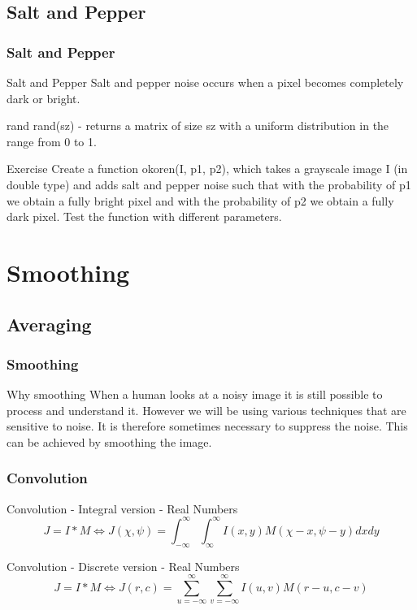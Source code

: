 \documentclass{beamer}
\begin{document}
\subsection{Salt and Pepper}
\begin{frame}
\frametitle{Salt and Pepper}
\begin{block}{Salt and Pepper}
Salt and pepper noise occurs when a pixel becomes completely dark or bright. 
\end{block}

\begin{block}{rand}
rand(sz) - returns a matrix of size sz with a uniform distribution in the range from 0 to 1.
\end{block}


\begin{block}{Exercise}
Create a function okoren(I, p1, p2), which takes a grayscale image I (in double type) and adds salt and pepper noise such that with the probability of p1 we obtain a fully bright pixel and with the probability of p2 we obtain a fully dark pixel. Test the function with different parameters.
\end{block}
\end{frame}


\section{Smoothing}
\subsection{Averaging}
\begin{frame}
\frametitle{Smoothing}
\begin{block}{Why smoothing}
When a human looks at a noisy image it is still possible to process and understand it. However we will be using various techniques that are sensitive to noise. It is therefore sometimes necessary to suppress the noise. This can be achieved by smoothing the image.
\end{block}
\end{frame}

\begin{frame}
\frametitle{Convolution}
\begin{block}{Convolution - Integral version - Real Numbers}
\begin{equation*}
J= I \ast M \iff J (\chi, \psi) = \int_{-\infty}^{\infty}\int_{\infty}^{\infty} I(x,y)M(\chi - x,\psi - y) dx dy
\end{equation*}
\end{block}

\begin{block}{Convolution - Discrete version - Real Numbers}
\begin{equation*}
J = I \ast M \iff J(r,c) = \sum_{u=-\infty}^{\infty}\sum_{v=-\infty}^{\infty} I(u,v)M(r-u,c-v)
\end{equation*}
\end{block}

\end{frame}
\end{document}
